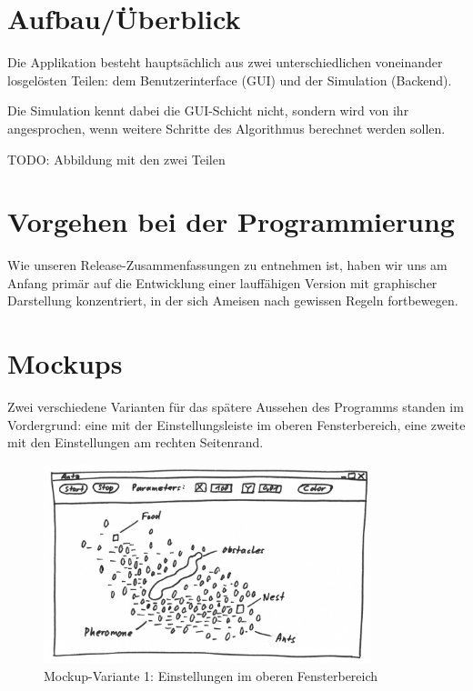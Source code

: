 
\section{Aufbau/Überblick}

Die Applikation besteht hauptsächlich aus zwei unterschiedlichen voneinander losgelösten Teilen: dem Benutzerinterface (GUI) und der Simulation (Backend).

Die Simulation kennt dabei die GUI-Schicht nicht, sondern wird von ihr angesprochen, wenn weitere Schritte des Algorithmus berechnet werden sollen.

TODO: Abbildung mit den zwei Teilen

\section{Vorgehen bei der Programmierung}

Wie unseren Release-Zusammenfassungen zu entnehmen ist, haben wir uns am Anfang primär auf die Entwicklung einer lauffähigen Version mit graphischer Darstellung konzentriert, in der sich Ameisen nach gewissen Regeln fortbewegen. 

\section{Mockups}

Zwei verschiedene Varianten für das spätere Aussehen des Programms standen im Vordergrund: eine mit der Einstellungsleiste im oberen Fensterbereich, eine zweite mit den Einstellungen am rechten Seitenrand.

\begin{figure}[h]
  \centering
	\includegraphics [width=0.85\textwidth]{images/Antz_Mockup_1_sw.png} 
	\caption{Mockup-Variante 1: Einstellungen im oberen Fensterbereich}
\end{figure}

